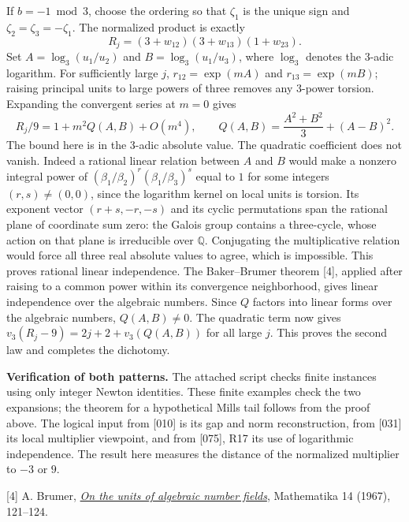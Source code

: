 \documentclass[11pt,a4paper,oneside,openany]{book}
\newcommand{\Q}{\mathbb Q}\newcommand{\C}{\mathbb C}\newcommand{\Z}{\mathbb Z}\newcommand{\F}{\mathbb F}\newcommand{\Tr}{\operatorname{Tr}}\newcommand{\Nm}{\operatorname{N}}\newcommand{\ord}{\operatorname{ord}}\newcommand{\K}{K}\newcommand{\OO}{\mathcal O_K}\newcommand{\unit}{\mathcal U}
\begin{document}
If $b=-1\bmod3$, choose the ordering so that $\zeta_1$ is the unique sign and $\zeta_2=\zeta_3=-\zeta_1$. The normalized product is exactly
\[
       R_j=(3+w_{12})(3+w_{13})(1+w_{23}).
\]
Set $A=\log_3(u_1/u_2)$ and $B=\log_3(u_1/u_3)$, where $\log_3$ denotes the $3$-adic logarithm. For sufficiently large $j$, $r_{12}=\exp(mA)$ and $r_{13}=\exp(mB)$; raising principal units to large powers of three removes any $3$-power torsion. Expanding the convergent series at $m=0$ gives
\[
 R_j/9=1+m^2 Q(A,B)+O(m^4),\qquad
 Q(A,B)=\frac{A^2+B^2}{3}+(A-B)^2 .
\]
The bound here is in the $3$-adic absolute value. The quadratic coefficient does not vanish. Indeed a rational linear relation between $A$ and $B$ would make a nonzero integral power of
$(\beta_1/\beta_2)^r(\beta_1/\beta_3)^s$ equal to $1$ for some integers $(r,s)\ne(0,0)$, since the logarithm kernel on local units is torsion. Its exponent vector $(r+s,-r,-s)$ and its cyclic permutations span the rational plane of coordinate sum zero: the Galois group contains a three-cycle, whose action on that plane is irreducible over $\Q$. Conjugating the multiplicative relation would force all three real absolute values to agree, which is impossible. This proves rational linear independence. The Baker--Brumer theorem [4], applied after raising to a common power within its convergence neighborhood, gives linear independence over the algebraic numbers. Since $Q$ factors into linear forms over the algebraic numbers, $Q(A,B)\ne0$. The quadratic term now gives $v_3(R_j-9)=2j+2+v_3(Q(A,B))$ for all large $j$. This proves the second law and completes the dichotomy.

\textbf{Verification of both patterns.} The attached script checks finite instances using only integer Newton identities. These finite examples check the two expansions; the theorem for a hypothetical Mills tail follows from the proof above. The logical input from [010] is its gap and norm reconstruction, from [031] its local multiplier viewpoint, and from [075], R17 its use of logarithmic independence. The result here measures the distance of the normalized multiplier to $-3$ or $9$.

[4] A. Brumer, \href{https://www.cambridge.org/core/journals/mathematika/article/abs/on-the-units-of-algebraic-number-fields/8390DA0413F8229C2961A35604480784}{\emph{On the units of algebraic number fields}}, Mathematika 14 (1967), 121--124.

\backmatter
\end{document}
